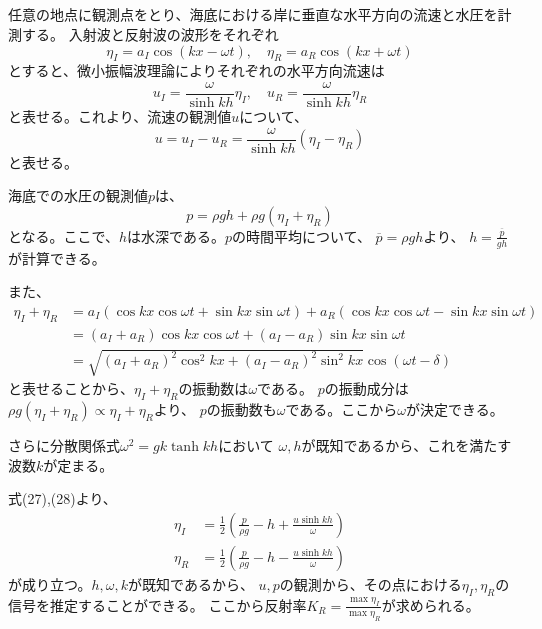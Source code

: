 \documentclass[a4paper]{jsarticle}
\begin{document}
\subsection{}
任意の地点に観測点をとり、海底における岸に垂直な水平方向の流速と水圧を計測する。
入射波と反射波の波形をそれぞれ
\begin{equation}
  \eta_I = a_I \cos (kx - \omega t),\quad
  \eta_R = a_R \cos (kx + \omega t)
\end{equation}
とすると、微小振幅波理論によりそれぞれの水平方向流速は
\begin{equation}
  u_I = \frac{\omega}{\sinh k h} \eta_I,\quad
  u_R = \frac{\omega}{\sinh k h} \eta_R
\end{equation}
と表せる。これより、流速の観測値$u$について、
\begin{equation}
  u = u_I - u_R = \frac{\omega}{\sinh k h} (\eta_I - \eta_R)
\end{equation}
と表せる。\par
海底での水圧の観測値$p$は、
\begin{equation}
  p = \rho g h + \rho g (\eta_I + \eta_R)
\end{equation}
となる。ここで、$h$は水深である。$p$の時間平均について、
$\overline{p} = \rho g h$より、
$h = \frac{\overline{p}}{g h}$が計算できる。\par
また、
\begin{equation}
  \begin{aligned}
    \eta_I + \eta_R
    &= a_I (\cos k x \cos \omega t + \sin k x \sin \omega t)
    + a_R (\cos k x \cos \omega t - \sin k x \sin \omega t) \\
    &= (a_I + a_R) \cos k x \cos \omega t
    + (a_I - a_R) \sin k x \sin \omega t \\
    &= \sqrt{(a_I + a_R)^2 \cos^2 k x + (a_I - a_R)^2 \sin^2 k x} \cos (\omega t - \delta)
  \end{aligned}
\end{equation}
と表せることから、$\eta_I + \eta_R$の振動数は$\omega$である。
$p$の振動成分は$\rho g (\eta_I + \eta_R) \propto \eta_I + \eta_R$より、
$p$の振動数も$\omega$である。ここから$\omega$が決定できる。\par
さらに分散関係式$\omega^2 = g k \tanh k h$において
$\omega, h$が既知であるから、これを満たす波数$k$が定まる。\par
式(27),(28)より、
\begin{align}
  \eta_I &= \frac{1}{2} \left(\frac{p}{\rho g} - h + \frac{u \sinh k h}{\omega}\right) \\
  \eta_R &= \frac{1}{2} \left(\frac{p}{\rho g} - h - \frac{u \sinh k h}{\omega}\right)
\end{align}
が成り立つ。$h, \omega, k$が既知であるから、
$u, p$の観測から、その点における$\eta_I, \eta_R$の信号を推定することができる。
ここから反射率$K_R = \frac{\max \eta_I}{\max \eta_R}$が求められる。
\end{document}
